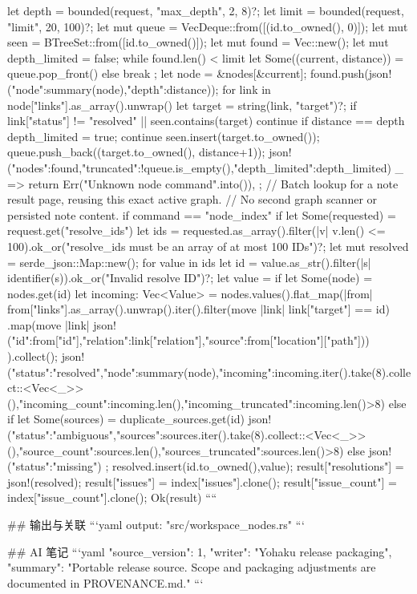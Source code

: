 {{{{                let depth = bounded(request, "max_depth", 2, 8)?;
                let limit = bounded(request, "limit", 20, 100)?;
                let mut queue = VecDeque::from([(id.to_owned(), 0)]);
                let mut seen = BTreeSet::from([id.to_owned()]);
                let mut found = Vec::new();
                let mut depth_limited = false;
                while found.len() < limit {
                    let Some((current, distance)) = queue.pop_front() else { break };
                    let node = &nodes[&current];
                    found.push(json!({"node":summary(node),"depth":distance}));
                    for link in node["links"].as_array().unwrap() {
                        let target = string(link, "target")?;
                        if link["status"] != "resolved" || seen.contains(target) { continue }
                        if distance == depth { depth_limited = true; continue }
                        seen.insert(target.to_owned());
                        queue.push_back((target.to_owned(), distance+1));
                    }
                }
                json!({"nodes":found,"truncated":!queue.is_empty(),"depth_limited":depth_limited})
            }
            _ => return Err("Unknown node command".into()),
        };
        // Batch lookup for a note result page, reusing this exact active graph.
        // No second graph scanner or persisted note content.
        if command == "node_index" {
            if let Some(requested) = request.get("resolve_ids") {
                let ids = requested.as_array().filter(|v| v.len() <= 100).ok_or("resolve_ids must be an array of at most 100 IDs")?;
                let mut resolved = serde_json::Map::new();
                for value in ids {
                    let id = value.as_str().filter(|s| identifier(s)).ok_or("Invalid resolve ID")?;
                    let value = if let Some(node) = nodes.get(id) {
                        let incoming: Vec<Value> = nodes.values().flat_map(|from| {
                            from["links"].as_array().unwrap().iter().filter(move |link| link["target"] == id)
                                .map(move |link| json!({"id":from["id"],"relation":link["relation"],"source":from["location"]["path"]}))
                        }).collect();
                        json!({"status":"resolved","node":summary(node),"incoming":incoming.iter().take(8).collect::<Vec<_>>(),"incoming_count":incoming.len(),"incoming_truncated":incoming.len()>8})
                    } else if let Some(sources) = duplicate_sources.get(id) {
                        json!({"status":"ambiguous","sources":sources.iter().take(8).collect::<Vec<_>>(),"source_count":sources.len(),"sources_truncated":sources.len()>8})
                    } else { json!({"status":"missing"}) };
                    resolved.insert(id.to_owned(),value);
                }
                result["resolutions"] = json!(resolved);
            }
        }
        result["issues"] = index["issues"].clone();
        result["issue_count"] = index["issue_count"].clone();
        Ok(result)
    }
}
````

## 输出与关联
```yaml
output: "src/workspace_nodes.rs"
```

## AI 笔记
```yaml
{"source_version": 1, "writer": "Yohaku release packaging", "summary": "Portable release source. Scope and packaging adjustments are documented in PROVENANCE.md."}
```
